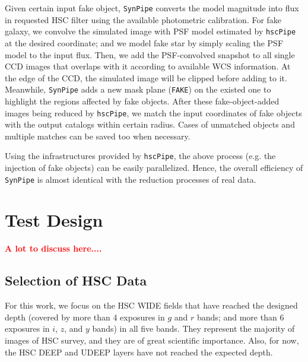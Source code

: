 \documentclass{pasj01}
\newcommand{\todo}[1]{\textcolor{red} {\textbf{#1}}}
\begin{document}
    Given certain input fake object, \texttt{SynPipe} converts the model magnitude into flux
    in requested HSC filter using the available photometric calibration.  For fake galaxy, we
    convolve the simulated image with PSF model estimated by \texttt{hscPipe} at the desired
    coordinate; and we model fake star by simply scaling the PSF model to the input flux.
    Then, we add the PSF-convolved snapshot to all single CCD images that overlaps with it
    according to available WCS information.  At the edge of the CCD, the simulated image will
    be clipped before adding to it.  Meanwhile, \texttt{SynPipe} adds a new mask plane
    (\texttt{FAKE}) on the existed one to highlight the regions affected by fake objects.
    After these fake-object-added images being reduced by \texttt{hscPipe}, we match the input
    coordinates of fake objects with the output catalogs within certain radius.  Cases of
    unmatched objects and multiple matches can be saved too when necessary.  

    Using the infrastructures provided by \texttt{hscPipe}, the above process (e.g. the 
    injection of fake objects) can be easily parallelized.  Hence, the overall efficiency of
    \texttt{SynPipe} is almost identical with the reduction processes of real data.  
    

\section{Test Design}

\todo{A lot to discuss here....}

\subsection{Selection of HSC Data}

    For this work, we focus on the HSC WIDE fields that have reached the designed 
    depth (covered by more than 4 exposures in $g$ and $r$ bands; and more than 6 
    exposures in $i$, $z$, and $y$ bands) in all five bands. 
    They represent the majority of images of HSC survey, and they are of great 
    scientific importance.  
    Also, for now, the HSC DEEP and UDEEP layers have not reached the expected depth. 
    
\end{document}
